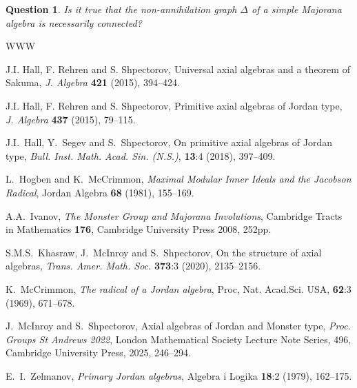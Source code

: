 \documentclass[12pt]{article}
\newtheorem{question}[theorem]{Question}
\newcommand\Dl{\Delta}
\begin{document}
\begin{question}
Is it true that the non-annihilation graph $\Dl$ of a simple Majorana algebra is 
necessarily connected?
\end{question}

\begin{thebibliography}{WWW}

 J.I. Hall, F. Rehren and S. Shpectorov, Universal axial algebras and a theorem of Sakuma, \textit{J. Algebra} {\bf 421} (2015), 394--424.

 J.I. Hall, F. Rehren and S. Shpectorov, Primitive axial algebras of Jordan type, \textit{J. Algebra} {\bf 437} (2015), 79--115.

 J.I.~Hall, Y.~Segev and S.~Shpectorov, On primitive 
axial algebras of Jordan type, \textit{Bull. Inst. Math. Acad. Sin. 
\textup{(}N.S.\textup{)}}, {\bf 13}:4 (2018), 397--409.

 L.~Hogben  and K.~McCrimmon,  \textit{Maximal Modular Inner Ideals and the Jacobson Radical}, Jordan Algebra {\bf 68} (1981), 155--169.

 A.A.~Ivanov, \textit{The Monster Group and Majorana Involutions}, 
Cambridge Tracts in Mathematics {\bf 176}, Cambridge University Press 2008, 252pp.

 S.M.S.~Khasraw, J.~McInroy and S.~Shpectorov, On the 
structure of axial algebras, {\it Trans. Amer. Math. Soc.} 
{\bf373}:3 (2020), 2135--2156.


 K.~McCrimmon, 
\textit{The radical of a Jordan algebra}, Proc, Nat. Acad.Sci. USA, {\bf 62}:3 (1969), 671--678.

 J.~McInroy and S.~Shpectorov, Axial algebras of Jordan and Monster 
type, {\it Proc. Groups St Andrews 2022}, London Mathematical Society Lecture Note 
Series, 496, Cambridge University Press, 2025, 246--294.

 E.~I.~Zel\textquotesingle{}manov,  \textit{Primary Jordan algebras},  Algebra i Logika {\bf 18}:2 (1979), 162--175.


\end{thebibliography}

\Addresses
	  
\end{document}
